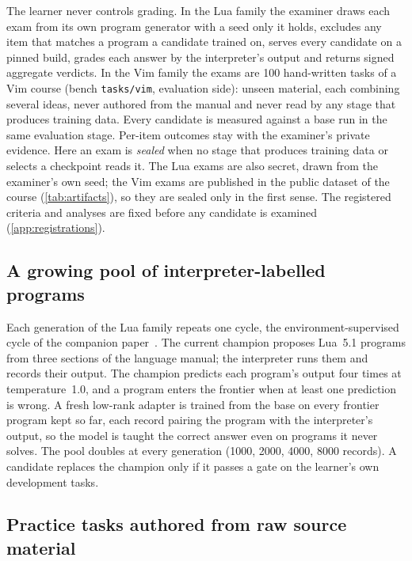 The learner never controls grading. In the Lua family the examiner draws each exam from its own program generator with a seed
only it holds, excludes any item that matches a program a candidate trained on, serves every candidate on a pinned build,
grades each answer by the interpreter's output and returns signed aggregate verdicts. In the Vim family the exams are 100
hand-written tasks of a Vim course (bench \texttt{tasks/vim}, evaluation side): unseen material, each combining several ideas,
never authored from the manual and never read by any stage that produces training data. Every candidate is measured against a
base run in the same evaluation stage. Per-item outcomes stay with the examiner's private evidence. Here an exam is \emph{sealed} when no stage that produces training data or selects a
checkpoint reads it. The Lua exams are also secret, drawn from the examiner's own seed; the Vim exams are published in the
public dataset of the course (\cref{tab:artifacts}), so they are sealed only in the first sense. The registered criteria
and analyses are fixed before any candidate is examined (\cref{app:registrations}).

\subsection{A growing pool of interpreter-labelled programs}\label{sec:m-pool}

Each generation of the Lua family repeats one cycle, the environment-supervised cycle of the companion
paper~\cite{frontier2026}. The current champion proposes Lua~5.1 programs from three sections of the language manual; the
interpreter runs them and records their output. The champion predicts each program's output four times at temperature~1.0,
and a program enters the frontier when at least one prediction is wrong. A fresh low-rank adapter is trained from the base on
every frontier program kept so far, each record pairing the program with the interpreter's output, so the model is taught the
correct answer even on programs it never solves. The pool doubles at every generation (1000, 2000, 4000, 8000 records). A
candidate replaces the champion only if it passes a gate on the learner's own development tasks.

\subsection{Practice tasks authored from raw source material}\label{sec:m-authoring}

